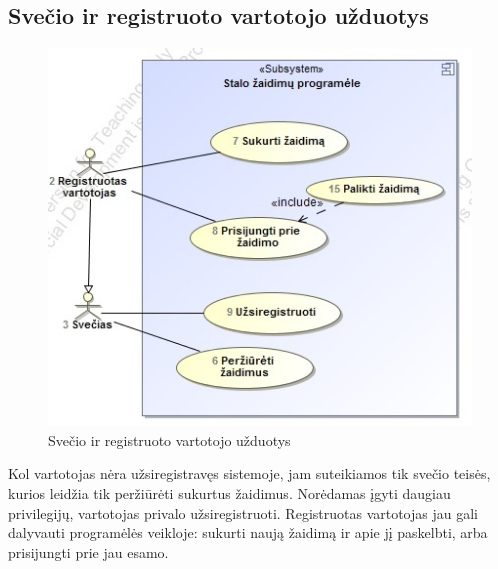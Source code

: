 \documentclass{VUMIFPSkursinis}
\begin{document}
	\subsection{Svečio ir registruoto vartotojo užduotys}
		\begin{figure}[H]
			\centering
			\includegraphics[scale=0.5]{img/UzduociuDiagrama1}
			\caption{Svečio ir registruoto vartotojo užduotys}
			\label{img:UzduociuDiagrama1}
		\end{figure}
		Kol vartotojas nėra užsiregistravęs sistemoje, jam suteikiamos tik svečio teisės, kurios leidžia tik peržiūrėti sukurtus žaidimus. Norėdamas įgyti daugiau privilegijų, vartotojas privalo užsiregistruoti. Registruotas vartotojas jau gali dalyvauti programėlės veikloje: sukurti naują žaidimą ir apie jį paskelbti, arba prisijungti prie jau esamo.
\end{document}
